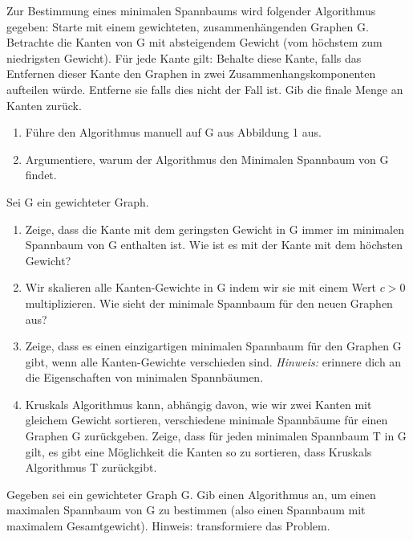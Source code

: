 \documentclass{uebung_cs}
\begin{document}
\begin{aufgabe}
	Zur Bestimmung eines minimalen Spannbaums wird folgender Algorithmus gegeben: Starte mit einem gewichteten, zusammenhängenden Graphen G. Betrachte die Kanten von G mit absteigendem Gewicht (vom höchstem zum niedrigsten Gewicht).
	Für jede Kante gilt: Behalte diese Kante, falls das Entfernen dieser Kante den Graphen in zwei Zusammenhangskomponenten aufteilen würde. Entferne sie falls dies nicht der Fall ist.
	Gib die finale Menge an Kanten zurück.
	\begin{enumerate}
		\item Führe den Algorithmus manuell auf G aus Abbildung 1 aus.
		\item Argumentiere, warum der Algorithmus den Minimalen Spannbaum von G findet.
	\end{enumerate}
\end{aufgabe}


\begin{aufgabe}
	Sei G ein gewichteter Graph.
	\begin{enumerate}
		\item Zeige, dass die Kante mit dem geringsten Gewicht in G immer im minimalen Spannbaum von G enthalten ist.
		Wie ist es mit der Kante mit dem höchsten Gewicht? 
		\item Wir skalieren alle Kanten-Gewichte in G indem wir sie mit einem Wert $c>0$ multiplizieren.
		Wie sieht der minimale Spannbaum für den neuen Graphen aus?
		\item Zeige, dass es einen einzigartigen minimalen Spannbaum für den Graphen G gibt, wenn alle Kanten-Gewichte verschieden sind.
		\textit{Hinweis:} erinnere dich an die Eigenschaften von minimalen Spannbäumen.
		\item Kruskals Algorithmus kann, abhängig davon, wie wir zwei Kanten mit gleichem Gewicht sortieren, verschiedene minimale Spannbäume für einen Graphen G zurückgeben.
		Zeige, dass für jeden minimalen Spannbaum T in G gilt, es gibt eine Möglichkeit die Kanten so zu sortieren, dass Kruskals Algorithmus T zurückgibt.
	\end{enumerate}
\end{aufgabe}


\begin{aufgabe}
	Gegeben sei ein gewichteter Graph G. Gib einen Algorithmus an, um einen maximalen Spannbaum von G zu bestimmen (also einen Spannbaum mit maximalem Gesamtgewicht).
	Hinweis: transformiere das Problem.
\end{aufgabe}
\end{document}
